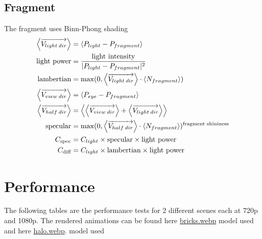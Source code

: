 \documentclass[12pt]{article}
\begin{document}
\subsection{Fragment}
The fragment uses Binn-Phong shading 
\begin{gather*}\begin{aligned}
		\left\langle \overrightarrow{V_{light\hspace{0.2em}dir}} \right\rangle
			&=
			\left\langle P_{light}-P_{fragment}\right\rangle \notag\\
		\text{light power} 
			&= 
			\frac{\text{light intensity}}{| P_{light}-P_{fragment}|^2}\\
		\text{lambertian} 
			&= \max(0, \left\langle 
			\overrightarrow{V_{light\hspace{0.2em}dir}} \right\rangle \cdot   \left\langle N_{fragment}\right\rangle) \\
		\left\langle\overrightarrow{V_{view\hspace{0.2em}dir}} \right\rangle 
		&= 
		\left\langle P_{eye}-P_{fragment}\right\rangle\\
		\left\langle\overrightarrow{V_{half\hspace{0.2em}dir}} \right\rangle 
		&= 
			\left\langle 
				\left\langle\overrightarrow{V_{view\hspace{0.2em}dir}} \right\rangle
				+
				\left\langle \overrightarrow{V_{light\hspace{0.2em}dir}}  \right\rangle
			\right\rangle \\
		\text{specular} &= \max(0, 
			\left\langle\overrightarrow{V_{half\hspace{0.2em}dir}} \right\rangle
			\cdot
			\left\langle N_{fragment}\right\rangle			
		)^{\text{fragment shininess}}\\
		C_{\text{spec}} &= C_{light}\times \text{specular} \times \text{light power}\\
		C_{\text{diff}} &= C_{light}\times \text{lambertian} \times \text{light power}
\end{aligned}\end{gather*}


\section{Performance}
The following tables are the performance tests for 2 different scenes each at 720p and 1080p. The rendered animations can be found here
\href{https://github.com/ParkerTenBroeck/3P93/blob/b09e7ca83aa0af8b57b7c728cc38519cd7d9188d/p2/code/examples/bricks.webp}{bricks.webp} model used \cite{halo-model}
and here
\href{https://github.com/ParkerTenBroeck/3P93/blob/dff1995021a7f66e8c5a2a137551acbd2b20739f/p2/code/examples/halo.webp}{halo.webp}. model used \cite{bricks-model}
\end{document}
